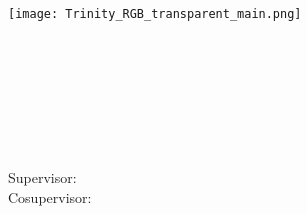 \begin{titlepage}

    \center %
    
    
    
    \texttt{[image: Trinity\_RGB\_transparent\_main.png]}\\[1cm] 
    
    \Large \school\\[1.5cm] %
    \ifdefined\department
    \large \department\\[1.5cm] %
    \fi
    
    \makeatletter
    { \huge \bfseries \thesistitle}\\[1.5cm] %
     
    
    
    \ifdefined\authorid
    \authorname\\ %
    \authorid\\[2cm] %
    \else
    \authorname\\[2cm] %
    \fi
    
    
    Supervisor: \supervisor\\[2cm] %
    \ifdefined\cosupervisor
    Cosupervisor: \cosupervisor\\[2cm] %
    \fi
    

\end{titlepage}
